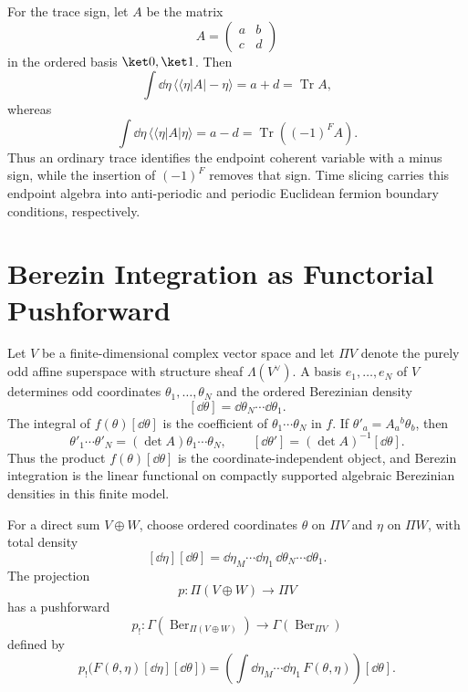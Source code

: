 For the trace sign, let \(A\) be the matrix
\[
  A=
  \begin{pmatrix} a&b\\ c&d\end{pmatrix}
\]
in the ordered basis \(\ket0,\ket1\). Then
\[
  \int\dd\eta\,\langle\!\langle\eta|A|-\eta\rangle=a+d
  =
  \operatorname{Tr}A,
\]
whereas
\[
  \int\dd\eta\,\langle\!\langle\eta|A|\eta\rangle=a-d
  =
  \operatorname{Tr}((-1)^F A).
\]
Thus an ordinary trace identifies the endpoint coherent variable with a minus
sign, while the insertion of \((-1)^F\) removes that sign. Time slicing carries
this endpoint algebra into anti-periodic and periodic Euclidean fermion
boundary conditions, respectively.

\section{Berezin Integration as Functorial Pushforward}

\begin{definition}
\label{def:finite-berezin-pushforward}
Let \(V\) be a finite-dimensional complex vector space and let
\(\Pi V\) denote the purely odd affine superspace with structure sheaf
\(\Lambda(V^\vee)\).  A basis \(e_1,\ldots,e_N\) of \(V\) determines odd
coordinates \(\theta_1,\ldots,\theta_N\) and the ordered Berezinian density
\[
  [\dd\theta]=\dd\theta_N\cdots\dd\theta_1 .
\]
The integral of \(f(\theta)[\dd\theta]\) is the coefficient of
\(\theta_1\cdots\theta_N\) in \(f\).  If
\(\theta'_a=A_a{}^b\theta_b\), then
\[
  \theta'_1\cdots\theta'_N=(\det A)\theta_1\cdots\theta_N,
  \qquad
  [\dd\theta']=(\det A)^{-1}[\dd\theta].
\]
Thus the product \(f(\theta)[\dd\theta]\) is the coordinate-independent
object, and Berezin integration is the linear functional on compactly
supported algebraic Berezinian densities in this finite model.

For a direct sum \(V\oplus W\), choose ordered coordinates \(\theta\) on
\(\Pi V\) and \(\eta\) on \(\Pi W\), with total density
\[
  [\dd\eta][\dd\theta]
  =
  \dd\eta_M\cdots\dd\eta_1\,\dd\theta_N\cdots\dd\theta_1 .
\]
The projection
\[
  p:\Pi(V\oplus W)\longrightarrow \Pi V
\]
has a pushforward
\[
  p_!:\Gamma(\operatorname{Ber}_{\Pi(V\oplus W)})
  \longrightarrow
  \Gamma(\operatorname{Ber}_{\Pi V})
\]
defined by
\[
  p_!\bigl(F(\theta,\eta)[\dd\eta][\dd\theta]\bigr)
  =
  \left(
    \int\dd\eta_M\cdots\dd\eta_1\,F(\theta,\eta)
  \right)
  [\dd\theta].
\]
\end{definition}

